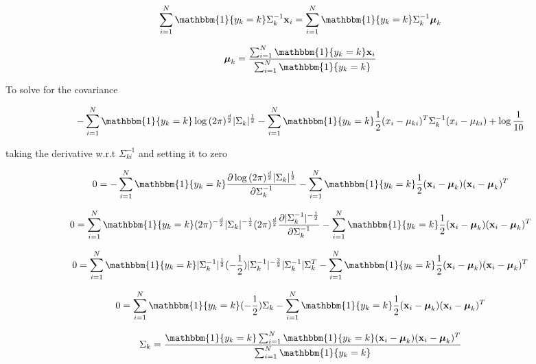 \documentclass[12pt,letterpaper]{article} %
\newcommand{\bs}[1]{\bm{\mathrm{#1}}} %
\newcommand{\switch}[0]{\mathbbm{1}\{y_k=k\}}
\begin{document}
\begin{equation*} 
 \sum^N_{i=1}\switch\Sigma_k^{-1}\bs{x}_i = \sum^N_{i=1}\switch\Sigma_k^{-1} \bs{\mu}_{k}
\end{equation*}

\begin{equation*} 
 \bs{\mu}_{k} =\frac{\sum^N_{i=1}\switch{}\bs{x}_i}{\sum^N_{i=1}\switch}
\end{equation*}

To solve for the covariance

\begin{equation*} 
 -\sum^N_{i=1}\switch{}\log{(2\pi)^{\frac{d}{2}}|\Sigma_k|^{\frac{1}{2}}}-\sum^N_{i=1}\switch{}\frac{1}{2}(x_i-\mu_{ki})^T\Sigma_k^{-1}(x_i -\mu_{ki}) + \log{\frac{1}{10}}
 \end{equation*}
 
 taking the derivative w.r.t $\Sigma^{-1}_{ki}$ and setting it to zero
 
 \begin{equation*} 
 0=-\sum^N_{i=1}\switch{}\frac{\partial\log{(2\pi)^{\frac{d}{2}}|\Sigma_k|^{\frac{1}{2}}}}{\partial\Sigma^{-1}_{k}}-\sum^N_{i=1}\switch{}\frac{1}{2}(\bs{x}_i-\bs{\mu}_k)(\bs{x}_i -\bs{\mu}_k)^T 
 \end{equation*}
 
 \begin{equation*} 
 0= \sum^N_{i=1}\switch(2\pi)^{-\frac{d}{2}}|\Sigma_k|^{-\frac{1}{2}}(2\pi)^{\frac{d}{2}}\frac{\partial|\Sigma_{k}^{-1}|^{-\frac{1}{2}}}{\partial\Sigma^{-1}_{k}} - \sum^N_{i=1}\switch{}\frac{1}{2}(\bs{x}_i-\bs{\mu}_k)(\bs{x}_i -\bs{\mu}_k)^T 
 \end{equation*}
 
  \begin{equation*} 
   0 = \sum^N_{i=1}\switch|\Sigma_k^{-1}|^{\frac{1}{2}}(-\frac{1}{2})|\Sigma_k^{-1}|^{-\frac{3}{2}}|\Sigma_{k}^{-1}|\Sigma_{k}^{T}- \sum^N_{i=1}\switch{}\frac{1}{2}(\bs{x}_i-\bs{\mu}_k)(\bs{x}_i -\bs{\mu}_k)^T 
  \end{equation*}

  \begin{equation*} 
   0 = \sum^N_{i=1}\switch(-\frac{1}{2})\Sigma_{k}- \sum^N_{i=1}\switch{}\frac{1}{2}(\bs{x}_i-\bs{\mu}_k)(\bs{x}_i -\bs{\mu}_k)^T 
  \end{equation*}

  \begin{equation*} 
   \Sigma_{k} = \frac{\switch \sum^N_{i=1}\switch{}(\bs{x}_i-\bs{\mu}_k)(\bs{x}_i -\bs{\mu}_k)^T }{\sum^N_{i=1}\switch}
  \end{equation*}
  
\end{document}
